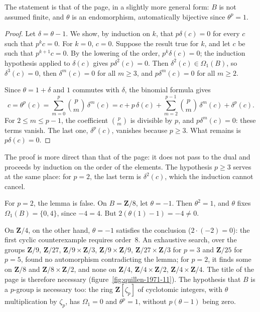 \noindent The statement is that of the page, in a slightly more general form: $B$ is not assumed finite, and $\theta$ is an endomorphism, automatically bijective since $\theta^p = 1$.

\begin{proof}
Let $\delta = \theta - 1$. We show, by induction on $k$, that $p\delta(c) = 0$ for every $c$ such that $p^k c = 0$. For $k = 0$, $c = 0$. Suppose the result true for $k$, and let $c$ be such that $p^{k+1} c = 0$. By the lowering of the order, $p^k \delta(c) = 0$; the induction hypothesis applied to $\delta(c)$ gives $p\delta^2(c) = 0$. Then $\delta^2(c) \in \Omega_1(B)$, so $\delta^3(c) = 0$, then $\delta^m(c) = 0$ for all $m \ge 3$, and $p\delta^m(c) = 0$ for all $m \ge 2$.

Since $\theta = 1 + \delta$ and $1$ commutes with $\delta$, the binomial formula gives
\[
c = \theta^p(c) = \sum_{m = 0}^{p} \binom{p}{m}\, \delta^m(c) = c + p\,\delta(c) + \sum_{m = 2}^{p - 1} \binom{p}{m}\, \delta^m(c) + \delta^p(c).
\]
For $2 \le m \le p - 1$, the coefficient $\binom{p}{m}$ is divisible by $p$, and $p\delta^m(c) = 0$: these terms vanish. The last one, $\delta^p(c)$, vanishes because $p \ge 3$. What remains is $p\delta(c) = 0$.
\end{proof}

\noindent The proof is more direct than that of the page: it does not pass to the dual and proceeds by induction on the order of the elements. The hypothesis $p \ge 3$ serves at the same place: for $p = 2$, the last term is $\delta^2(c)$, which the induction cannot cancel.

\begin{contrexemple}\label{ce:quillen-1971-11}
For $p = 2$, the lemma is false. On $B = \mathbf Z/8$, let $\theta = -1$. Then $\theta^2 = 1$, and $\theta$ fixes $\Omega_1(B) = \{0, 4\}$, since $-4 = 4$. But $2(\theta(1) - 1) = -4 \ne 0$.
\end{contrexemple}

\noindent On $\mathbf Z/4$, on the other hand, $\theta = -1$ satisfies the conclusion ($2 \cdot (-2) = 0$): the first cyclic counterexample requires order~$8$. An exhaustive search, over the groups $\mathbf Z/9$, $\mathbf Z/27$, $\mathbf Z/9 \times \mathbf Z/3$, $\mathbf Z/9 \times \mathbf Z/9$, $\mathbf Z/27 \times \mathbf Z/3$ for $p = 3$ and $\mathbf Z/25$ for $p = 5$, found no automorphism contradicting the lemma; for $p = 2$, it finds some on $\mathbf Z/8$ and $\mathbf Z/8 \times \mathbf Z/2$, and none on $\mathbf Z/4$, $\mathbf Z/4 \times \mathbf Z/2$, $\mathbf Z/4 \times \mathbf Z/4$. The title  of the page is therefore necessary (figure~\ref{fig:quillen-1971-11}). The hypothesis that $B$ is a $p$-group is necessary too: the ring $\mathbf Z[\zeta_p]$ of cyclotomic integers, with $\theta$ multiplication by $\zeta_p$, has $\Omega_1 = 0$ and $\theta^p = 1$, without $p(\theta - 1)$ being zero.


